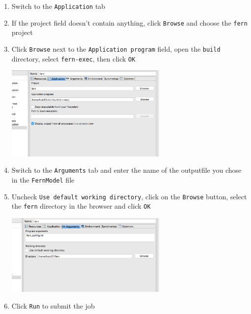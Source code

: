 \begin{enumerate}
  \item Switch to the \texttt{Application} tab
  \item If the project field doesn't contain anything, click \texttt{Browse} and
  choose the \texttt{fern} project
  \item Click \texttt{Browse} next to the \texttt{Application program} field,
  open the \texttt{build} directory, select \texttt{fern-exec}, then click
  \texttt{OK}
  
  \begin{center} \includegraphics[width=300]{figures/applicationTab}
  \end{center}
  
  \item Switch to the \texttt{Arguments} tab and enter the name of the
  outputfile you chose in the \texttt{FernModel} file
  \item Uncheck \texttt{Use default working directory}, click on the
  \texttt{Browse} button, select the \texttt{fern} directory in the browser and
  click \texttt{OK}
  
  \begin{center} \includegraphics[width=300]{figures/argumentsTab}
  \end{center}
  
  \item Click \texttt{Run} to submit the job 
\end{enumerate}

